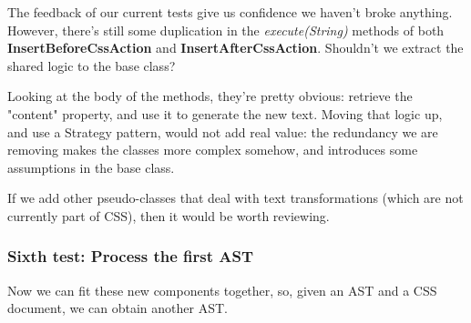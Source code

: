 \documentclass[11pt]{article}
\begin{document}
The feedback of our current tests give us confidence we haven't broke anything.
However, there's still some duplication in the \emph{execute(String)} methods of both
\textbf{InsertBeforeCssAction} and \textbf{InsertAfterCssAction}. Shouldn't we extract the shared
logic to the base class?

Looking at the body of the methods, they're pretty obvious: retrieve the "content" property,
and use it to generate the new text. Moving that logic up, and use a Strategy pattern,
would not add real value: the redundancy we are removing makes the classes more complex
somehow, and introduces some assumptions in the base class.

If we add other pseudo-classes that deal with text transformations (which are not
currently part of CSS), then it would be worth reviewing.

\subsubsection{Sixth test: Process the first AST}
\label{sec-1-4-7}

Now we can fit these new components together, so, given an AST and a CSS document,
we can obtain another AST.
\end{document}
